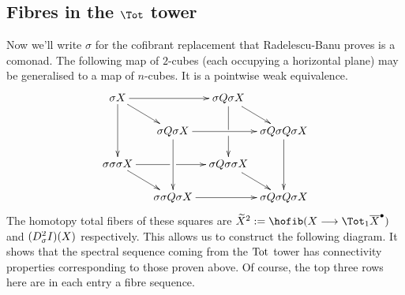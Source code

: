 \documentclass[10pt]{article}
\begin{document}
\begin{convergence}
\subsection{Fibres in the $\Tot$ tower}
Now we'll write $\sigma $ for the cofibrant replacement that Radelescu-Banu proves is a comonad. The following map of $2$-cubes (each occupying a horizontal plane) may be generalised to a map of $n$-cubes. It is a pointwise weak equivalence.
\[\def\labelstyle{\scriptstyle}
\xymatrix@!0@R=30pt@C=50pt{
\sigma X \ar[rr]\ar[rd]\ar[dd]         &           &   \sigma Q\sigma X \ar'[d][dd]           \ar[dr]  &                  \\
 &  \sigma Q\sigma X \ar[rr] \ar[dd]  &             & \sigma Q\sigma Q\sigma X
         \ar[dd] \\
\sigma \sigma \sigma X \ar'[r][rr] \ar[dr] &        &   \sigma Q\sigma \sigma X
\ar[dr] &                   \\
           &   \sigma \sigma Q\sigma X \ar[rr]      &                    &
\sigma Q\sigma Q\sigma X
}\]
The homotopy total fibers of these squares are $\widetilde{X}^2:=\hofib(X\to \Tot_1\overline{X}^\bullet)$ and $(D^{\smash{2}}_{\smash{\sigma}} I)(X)$ respectively. This allows us to construct the following diagram. It shows that the spectral sequence coming from the $\textup{Tot}$ tower has connectivity properties corresponding to those proven above. Of course, the top three rows here are in each entry a fibre sequence.

\end{convergence}
\end{document}
